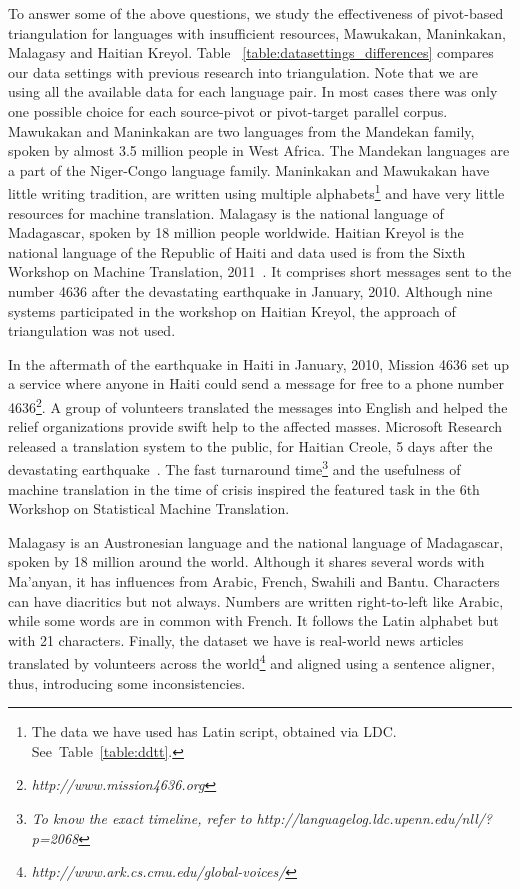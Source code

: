 \documentclass[11pt]{article}
\begin{document}
To answer some of the above questions, we study the effectiveness of pivot-based triangulation for languages with insufficient resources, Mawukakan, Maninkakan, Malagasy and Haitian Kreyol. Table ~\ref{table:datasettings_differences} compares our data settings with previous research into triangulation. Note that we are using all the available data for each language pair. In most cases there was only one possible choice for each source-pivot or pivot-target parallel corpus. Mawukakan and Maninkakan are two languages from the Mandekan family, spoken by almost 3.5 million people in West Africa. The Mandekan languages are a part of the Niger-Congo language family. Maninkakan and Mawukakan have little writing tradition, are written using multiple alphabets\footnote{The data we have used has Latin script, obtained via LDC. See~Table~\ref{table:ddtt}.} and have very little resources for machine translation. Malagasy is the national language of Madagascar, spoken by 18 million people worldwide. Haitian Kreyol is the national language of the Republic of Haiti and data used is from the Sixth Workshop on Machine Translation, 2011~\cite{WMT:11}. It comprises short messages sent to the number 4636 after the devastating earthquake in January, 2010. Although nine systems participated in the workshop on Haitian Kreyol, the approach of triangulation was not used. 

In the aftermath of the earthquake in Haiti in January, 2010, Mission 4636 set up a service where anyone in Haiti could send a message for free to a phone number 4636\footnote{\emph{http://www.mission4636.org}}. A group of volunteers translated the messages into English and helped the relief organizations provide swift help to the affected masses. Microsoft Research released a translation system to the public, for Haitian Creole, 5 days after the devastating earthquake~\cite{Lewis:11}. The fast turnaround time\footnote{\emph{To know the exact timeline, refer to http://languagelog.ldc.upenn.edu/nll/?p=2068}} and the usefulness of machine translation in the time of crisis inspired the featured task in the 6th Workshop on Statistical Machine Translation. 

Malagasy is an Austronesian language and the national language of Madagascar, spoken by 18 million around the world. Although it shares several words with Ma'anyan, it has influences from Arabic, French, Swahili and Bantu. Characters can have diacritics but not always. Numbers are written right-to-left like Arabic, while some words are in common with French. It follows the Latin alphabet but with 21 characters. Finally, the dataset we have is real-world news articles translated by volunteers across the world\footnote{\emph{http://www.ark.cs.cmu.edu/global-voices/}} and aligned using a sentence aligner, thus, introducing some inconsistencies. 
\end{document}

